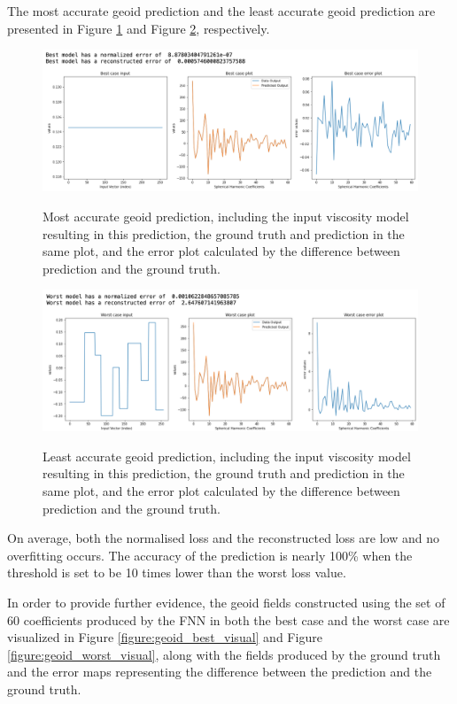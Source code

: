 The most accurate geoid prediction and the least accurate geoid prediction are presented in Figure \ref{figure:geoid_best} and Figure \ref{figure:geoid_worst}, respectively.

\begin{figure}[H]
    \caption{Most accurate geoid prediction, including the input viscosity model resulting in this prediction, the ground truth and prediction in the same plot, and the error plot calculated by the difference between prediction and the ground truth.}
    \includegraphics[scale=0.6]{figures/geoid_images/Geoid_Best.png}
    \label{figure:geoid_best}
\end{figure}

\begin{figure}[H]
    \caption{Least accurate geoid prediction, including the input viscosity model resulting in this prediction, the ground truth and prediction in the same plot, and the error plot calculated by the difference between prediction and the ground truth.}
    \includegraphics[scale=0.6]{figures/geoid_images/Geoid_Worst.png}
    \label{figure:geoid_worst}
\end{figure}

On average, both the normalised loss and the reconstructed loss are low and no overfitting occurs. The accuracy of the prediction is nearly 100\% when the threshold is set to be 10 times lower than the worst loss value. 

In order to provide further evidence, the geoid fields constructed using the set of 60 coefficients produced by the FNN in both the best case and the worst case are visualized in Figure \ref{figure:geoid_best_visual} and Figure \ref{figure:geoid_worst_visual}, along with the fields produced by the ground truth and the error maps representing the difference between the prediction and the ground truth.

